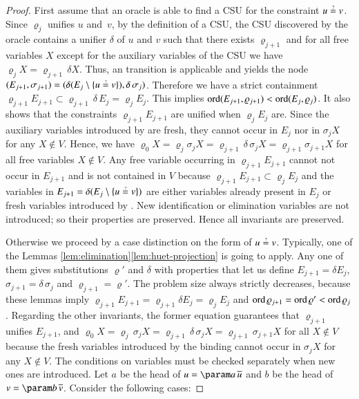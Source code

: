 \begin{proof}
    First assume that an oracle is able to find a CSU for the constraint $u\unif v$.
    Since $\varrho_{j}$ unifies $u$ and~$v$, by the definition of a CSU,
    the CSU discovered by the oracle 
    contains a
    unifier $\delta$ of $u$ and $v$ such that there exists $\varrho_{j+1}$
    and for all free variables $X$ except for the auxiliary variables of the CSU
    we have $\varrho_{j} X=\varrho_{j+1}\,\delta X$. Thus, an 
    transition is applicable and yields the node 
    $(E_{j+1},\sigma_{j+1})=(\delta(E_{j}\setminus\{ u\unif v\} ),\delta\,\sigma_{j})$.
    Therefore we have a strict containment $\varrho_{j+1}E_{j+1}\subset\varrho_{j+1}\,\delta\,E_{j}=\varrho_{j}E_{j}$.
    This implies $\operatorname{ord}(E_{j+1},\varrho_{j+1})<\operatorname{ord}(E_{j},\varrho_{j})$.
    It also shows that the constraints $\varrho_{j+1}E_{j+1}$ are unified
    when $\varrho_{j}E_{j}$ are. 
    Since the auxiliary variables introduced by  are fresh,
    they cannot occur in $E_j$ nor in $\sigma_{j} X$ for any $X\not\in V$. Hence,
    we have $\varrho_{0} X = \varrho_{j}\sigma_{j} X = \varrho_{j+1}\,\delta\,\sigma_{j} X =\varrho_{j+1}\sigma_{j+1} X$
    for all free variables $X\not\in V$.
    Any free variable occurring in $\varrho_{j+1}E_{j+1}$ cannot not occur in $E_{j+1}$ and is not contained in $V$
    because  $\varrho_{j+1}E_{j+1}\subset\varrho_{j}E_{j}$
    and the variables in $E_{j+1} = \delta(E_{j}\setminus\{ u\unif v\} )$
    are either variables already present in $E_{j}$ or fresh variables introduced by .
    New identification or elimination variables are not introduced;
    so their properties are preserved. Hence all invariants are preserved.

    Otherwise we proceed by a case distinction on the form of $u\unif v$.
    Typically, one of the Lemmas \ref{lem:elimination}\textendash{}\ref{lem:huet-projection}
    is going to apply. Any one of them gives substitutions $\varrho'$
    and $\delta$ with properties that let us define $E_{j+1}=\delta E_{j}$,
    $\sigma_{j+1}=\delta\,\sigma_{j}$ and $\varrho_{j+1}=\varrho'$.
    The problem size always strictly decreases, because 
    these lemmas imply
    $\varrho_{j+1}E_{j+1}=\varrho_{j+1}\delta E_{j}=\varrho_{j}E_{j}$
    and $\operatorname{ord}\varrho_{j+1}=\operatorname{ord}\varrho'<\operatorname{ord}\varrho_{j}$.
    Regarding the other invariants, the former equation guarantees that $\varrho_{j+1}$
    unifies $E_{j+1}$, and 
    $\varrho_{0} X = \varrho_{j}\,\sigma_{j} X = \varrho_{j+1}\,\delta\,\sigma_{j} X =\varrho_{j+1}\,\sigma_{j+1} X$
    for all $X \not\in V$ because the fresh variables introduced by the binding cannot occur in $\sigma_{j} X$ for any $X\not\in V$. The conditions on variables must be checked
    separately when new ones are introduced. Let $a$ be
    the head of $u=\param a\,\seq u$ and $b$ be the head of $v = \param b\,\seq v$.
    Consider the following cases:


\end{proof}
